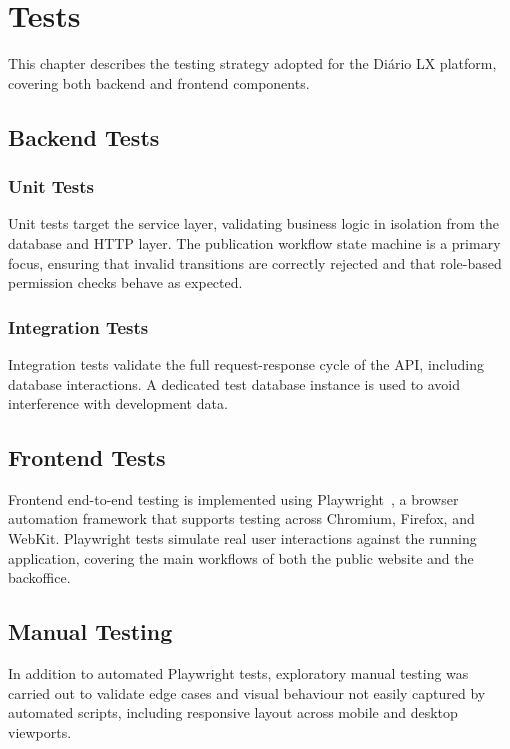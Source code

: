 %
%
\chapter{Tests} \label{cap:tests}

This chapter describes the testing strategy adopted for the Diário LX platform, covering both backend and frontend components.

\section{Backend Tests} \label{sec:tests_backend}

\subsection{Unit Tests} \label{sec:tests_be_unit}

Unit tests target the service layer, validating business logic in isolation from the database and HTTP layer. The publication workflow state machine is a primary focus, ensuring that invalid transitions are correctly rejected and that role-based permission checks behave as expected.

\subsection{Integration Tests} \label{sec:tests_be_integration}

Integration tests validate the full request-response cycle of the API, including database interactions. A dedicated test database instance is used to avoid interference with development data.

\section{Frontend Tests} \label{sec:tests_frontend}
Frontend end-to-end testing is implemented using Playwright~\cite{playwright}, a browser automation framework that supports testing across Chromium, Firefox, and WebKit. Playwright tests simulate real user interactions against the running application, covering the main workflows of both the public website and the backoffice.

\section{Manual Testing} \label{sec:tests_manual}
In addition to automated Playwright tests, exploratory manual testing was carried out to validate edge cases and visual behaviour not easily captured by automated scripts, including responsive layout across mobile and desktop viewports.
